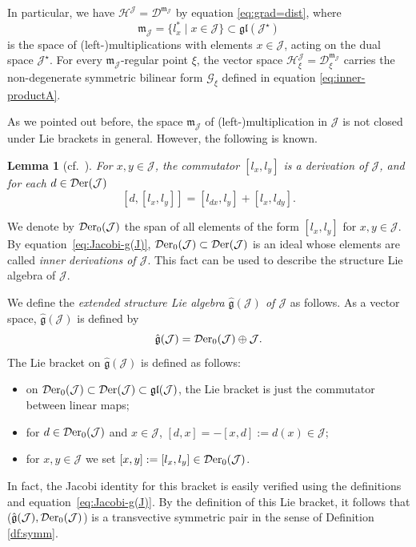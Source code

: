 \documentclass[10pt,a4paper]{amsart}
\numberwithin{equation}{section}
\newtheorem{Lemma}[Theorem]{Lemma}
\newcommand{\be}{\begin{equation}}
\newcommand{\ee}{\end{equation}}
\newcommand{\hh}{\mathcal{H}}
\newcommand{\Der}{\mathcal{D}{\rm er}}
\newcommand{\dcal}{\mathcal{D}}
\newcommand{\Jcal}{\mathcal{J}}
\newcommand{\m}{\mathfrak{m}}
\newcommand{\g}{{\mathfrak{g}}}
\renewcommand{\m}{{\mathfrak m}}
\newcommand{\gl}{{\mathfrak{gl}}}
\newcommand{\Gcal}{\mathcal{G}}
\begin{document}
In particular, we have $\hh^\Jcal = \dcal^{\m_\Jcal}$ by equation \eqref{eq:grad=dist}, where
\[
\m_\Jcal = \{l_x^\ast \mid x \in \Jcal\} \subset \gl(\Jcal^\star)
\]
is the space of (left-)multiplications with elements $x \in \Jcal$, acting on the dual space $\Jcal^\star$.
For every $\m_\Jcal$-regular point $\xi$, the vector space $\hh^\Jcal_\xi = \dcal^{\m_\Jcal}_\xi$ carries the non-degenerate symmetric bilinear form $\Gcal_\xi$ defined in equation \eqref{eq:inner-productA}.

As we pointed out before, the space $\m_\Jcal$ of (left-)multiplication in $\Jcal$ is not closed under Lie brackets in general.
However, the following is known.

\begin{Lemma}[{cf.\ \cite[Lemma IV.7]{Koecher-1999}}] \label{structure Lie algebra}
 For $x, y \in \Jcal$, the commutator $[l_x, l_y]$ is a derivation of $\Jcal$, and for each $d \in \Der(\Jcal)$
\be \label{eq:Jacobi-g(J)} [d, [l_x, l_y]] = [l_{dx}, l_y] + [l_x, l_{dy}].
\ee
\end{Lemma}

We denote by $\Der_0(\Jcal)$ the span of all elements of the form $[l_x, l_y]$ for $x,y \in \Jcal$.
By equation~\eqref{eq:Jacobi-g(J)}, $\Der_0(\Jcal) \subset \Der(\Jcal)$ is an ideal whose elements are called {\em inner derivations of $\Jcal$}.
This fact can be used to describe the structure Lie algebra of $\Jcal$.

\begin{Definition}\label{prop: structure of the Lie algebra of the structure group}
We define the {\em extended structure Lie algebra $\hat \g(\Jcal)$ of $\Jcal$ }as follows.
As a vector space, $\hat \g(\Jcal)$ is defined by
\[%
\hat \g(\Jcal) = \Der_0(\Jcal) \oplus \Jcal.
\]
The Lie bracket on $\hat \g(\Jcal)$ is defined as follows:
\begin{itemize}\itemsep=0pt
\item on $\Der_0(\Jcal) \subset \Der(\Jcal) \subset \gl(\Jcal)$, the Lie bracket is just the commutator between linear maps;
\item for $d \in \Der_0(\Jcal)$ and $x \in \Jcal$, $[d, x] = - [x, d] := d(x) \in \Jcal$;
\item for $x,y \in \Jcal$ we set $[x,y] := [l_x, l_y] \in \Der_0(\Jcal)$.
\end{itemize}
\end{Definition}

In fact, the Jacobi identity for this bracket is easily verified using the definitions and equation~\eqref{eq:Jacobi-g(J)}.
By the definition of this Lie bracket, it follows that ($\hat \g(\Jcal),\Der_0(\Jcal) $) is a transvective symmetric pair in the sense of Definition \ref{df:symm}.
\end{document}
